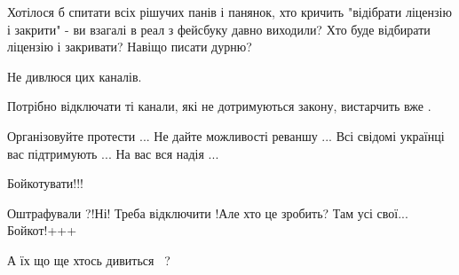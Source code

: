 \begin{itemize}
Хотілося б спитати всіх рішучих панів і панянок, хто кричить "відібрати
ліцензію і закрити" - ви взагалі в реал з фейсбуку давно виходили? Хто буде
відбирати ліцензію і закривати? Навіщо писати дурню?


 
Не дивлюся цих каналів.

 
Потрібно відключати ті канали, які не дотримуються закону, вистарчить вже .

 
Організовуйте протести ... Не дайте можливості реваншу ... Всі свідомі українці
вас підтримують ... На вас вся надія ...

 
Бойкотувати!!!

 
Оштрафували ?!Ні! Треба відключити !Але хто це зробить? Там усі свої... Бойкот!+++

 
А їх що ще хтось дивиться🥶🥶🥶?

 

\end{itemize}
